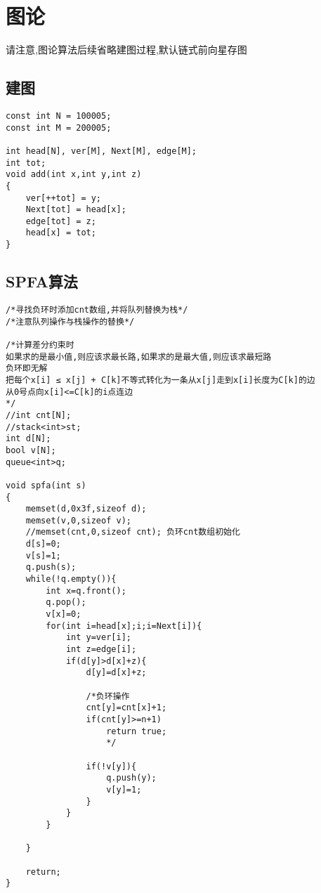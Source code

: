 \documentclass[twocolumn,a4]{article}
\begin{document}
\section{图论}
请注意,图论算法后续省略建图过程,默认链式前向星存图
\subsection{建图}
\begin{lstlisting}
const int N = 100005;
const int M = 200005;

int head[N], ver[M], Next[M], edge[M];
int tot;
void add(int x,int y,int z)
{
    ver[++tot] = y;
    Next[tot] = head[x];
    edge[tot] = z;
    head[x] = tot;
}
\end{lstlisting}

\subsection{SPFA算法}
\begin{lstlisting}
/*寻找负环时添加cnt数组,并将队列替换为栈*/
/*注意队列操作与栈操作的替换*/

/*计算差分约束时
如果求的是最小值,则应该求最长路,如果求的是最大值,则应该求最短路
负环即无解
把每个x[i] ≤ x[j] + C[k]不等式转化为一条从x[j]走到x[i]长度为C[k]的边
从0号点向x[i]<=C[k]的i点连边
*/
//int cnt[N];
//stack<int>st;
int d[N];
bool v[N];
queue<int>q;

void spfa(int s)
{
    memset(d,0x3f,sizeof d);
    memset(v,0,sizeof v);
    //memset(cnt,0,sizeof cnt); 负环cnt数组初始化
    d[s]=0;
    v[s]=1;
    q.push(s);
    while(!q.empty()){
        int x=q.front();
        q.pop();
        v[x]=0;
        for(int i=head[x];i;i=Next[i]){
            int y=ver[i];
            int z=edge[i];
            if(d[y]>d[x]+z){
                d[y]=d[x]+z;

                /*负环操作
                cnt[y]=cnt[x]+1;
                if(cnt[y]>=n+1)
                    return true;
                    */

                if(!v[y]){
                    q.push(y);
                    v[y]=1;
                }
            }
        }
        
    }
    
    return;
}
\end{lstlisting}
\end{document}
